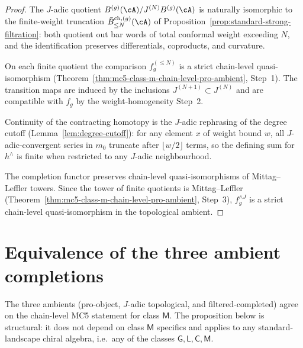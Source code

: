 \begin{proof}
The $J$-adic quotient $B^{(g)}(\cA) / J^{(N)} B^{(g)}(\cA)$ is naturally
isomorphic to the finite-weight truncation
$\bar B^{\mathrm{ch}, (g)}_{\leq N}(\cA)$ of
Proposition~\textup{\ref{prop:standard-strong-filtration}}:
both quotient out bar words of total conformal weight exceeding $N$,
and the identification preserves differentials, coproducts, and
curvature.

On each finite quotient the comparison $f_g^{(\leq N)}$ is a strict
chain-level quasi-isomorphism
\textup{(}Theorem~\textup{\ref{thm:mc5-class-m-chain-level-pro-ambient}},
Step~1\textup{)}. The transition maps are induced by the inclusions
$J^{(N+1)} \subset J^{(N)}$ and are compatible with $f_g$ by the
weight-homogeneity Step~2.

Continuity of the contracting homotopy is the $J$-adic rephrasing of the
degree cutoff
\textup{(}Lemma~\textup{\ref{lem:degree-cutoff}}\textup{)}: for any
element $x$ of weight bound $w$, all $J$-adic-convergent series in $m_0$
truncate after $\lfloor w/2 \rfloor$ terms, so the defining sum for
$h^{\wedge}$ is finite when restricted to any $J$-adic neighbourhood.

The completion functor preserves chain-level quasi-isomorphisms of
Mittag--Leffler towers. Since the tower of finite quotients is
Mittag--Leffler
\textup{(}Theorem~\textup{\ref{thm:mc5-class-m-chain-level-pro-ambient}},
Step~3\textup{)}, $f_g^{\wedge J}$ is a strict chain-level
quasi-isomorphism in the topological ambient.
\end{proof}

\section{Equivalence of the three ambient completions}
\label{sec:mc5-ambient-equivalence}

The three ambients (pro-object, $J$-adic topological, and
filtered-completed) agree on the chain-level MC5 statement for class
$\mathsf{M}$. The proposition below is structural:
it does not depend on class $\mathsf{M}$ specifics and applies to any
standard-landscape chiral algebra, i.e.\ any of the classes
$\mathsf{G}, \mathsf{L}, \mathsf{C}, \mathsf{M}$.

